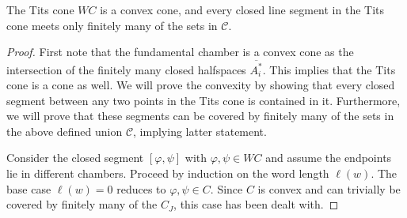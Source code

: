 \begin{theorem}
    The Tits cone \(WC\) is a convex cone, and every closed line segment in the Tits cone meets only finitely many of the sets in \(\mathcal{C}\).
\end{theorem}
\begin{proof}
    First note that the fundamental chamber is a convex cone as the intersection of the finitely many closed halfspaces \(\overline{A_i^*}\).
    This implies that the Tits cone is a cone as well.
    We will prove the convexity by showing that every closed segment between any two points in the Tits cone is contained in it.
    Furthermore, we will prove that these segments can be covered by finitely many of the sets in the above defined union \(\mathcal{C}\), implying latter statement.

    Consider the closed segment \([\varphi, \psi]\) with \(\varphi, \psi \in WC\) and assume the endpoints lie in different chambers. %
    Proceed by induction on the word length \(\ell(w)\). %
    The base case \(\ell(w) = 0\) reduces to \(\varphi, \psi \in C\).
    Since \(C\) is convex and can trivially be covered by finitely many of the \(C_J\), this case has been dealt with. %
    

\end{proof}
